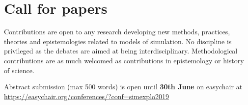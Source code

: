 \documentclass[11pt]{article}
\begin{document}
\section*{Call for papers}

Contributions are open to any research developing new methods, practices, theories and epistemologies related to models of simulation. No discipline is privileged as the debates are aimed at being interdisciplinary. Methodological contributions are as much welcomed as contributions in epistemology or history of science.

\bigskip

\noindent Abstract submission (max 500 words) is open until \textbf{30th June} on easychair at \url{https://easychair.org/conferences/?conf=simexplo2019}

\end{document}
